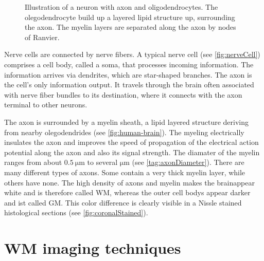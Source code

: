 \begin{figure}[!t]
\caption{Illustration of a neuron with axon and oligodendrocytes. The olegodendrocyte build up a layered lipid structure up, surrounding the axon. The myelin layers are separated along the axon by nodes of Ranvier.}
\label{fig:CortexAndNerveCell}
\end{figure}
%
Nerve cells are connected by nerve fibers.
A typical nerve cell (see \cref{fig:nerveCell}) comprises a cell body, called a soma, that processes incoming information.
The information arrives via dendrites, which are star-shaped branches.
The axon is the cell's only information output.
It travels through the brain often associated with nerve fiber bundles to its destination, where it connects with the axon terminal to other neurons.
\par
%
The axon is surrounded by a myelin sheath, a lipid layered structure deriving from nearby olegodendrides (see \cref{fig:human-brain}).
The myeling electrically insulates the axon and improves the speed of propagation of the electrical action potential along the axon and also its signal strength.
The diamater of the myelin ranges from about $\SI{0.5}{\micro\meter}$ to several $\si{\micro\meter}$ (see \cref{tag:axonDiameter}).
There are many different types of axons.
Some contain a very thick myelin layer, while others have none.
The high density of axons and myelin makes the brainappear white and is therefore called \ac{WM}, whereas the outer cell bodys appear darker and ist called \ac{GM}.
This color difference is clearly visible in a Nissle stained histological sections (see \cref{fig:coronalStained}).
%
% 
% 
% 
\section{WM imaging techniques}
% 
